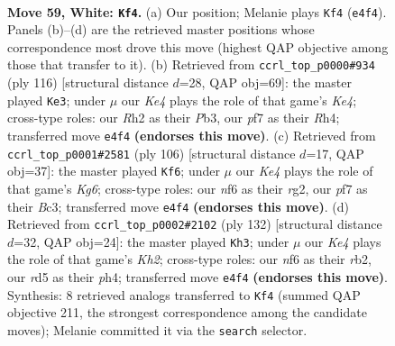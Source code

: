\documentclass[11pt]{article}
\begin{document}
\clearpage

\begin{figure}[p]\centering
\begin{subfigure}{0.46\textwidth}\centering
\resizebox{\linewidth}{!}{%
\newchessgame
\chessboard[
  setfen={7k/5p2/5n2/3r4/pB2K2p/P6P/5P1R/8 w - - 1 59},
  showmover=false,
  pgfstyle=straightmove, color=movearrow, markmove={e4-f4}
]}
\caption{}
\end{subfigure}\hfill
\begin{subfigure}{0.46\textwidth}\centering
\resizebox{\linewidth}{!}{%
\newchessgame
\chessboard[
  setfen={5r2/8/1p2k3/p5P1/P3KB1R/1P6/5n2/8 w - - 3 59},
  showmover=false,
  pgfstyle=straightmove, color=movearrow, markmove={e4-e3}
]}
\caption{}
\end{subfigure}
\\[4pt]
\begin{subfigure}{0.46\textwidth}\centering
\resizebox{\linewidth}{!}{%
\newchessgame
\chessboard[
  setfen={4k3/2p5/2n1p1K1/2P1P3/4P2P/2B4R/6r1/8 w - - 13 54},
  showmover=false,
  pgfstyle=straightmove, color=movearrow, markmove={g6-f6}
]}
\caption{}
\end{subfigure}\hfill
\begin{subfigure}{0.46\textwidth}\centering
\resizebox{\linewidth}{!}{%
\newchessgame
\chessboard[
  setfen={5k2/7p/5P2/R5P1/p1p4p/P7/1r5K/8 w - - 0 67},
  showmover=false,
  pgfstyle=straightmove, color=movearrow, markmove={h2-h3}
]}
\caption{}
\end{subfigure}
\caption{\textbf{Move 59, White: \texttt{Kf4}.} (a) Our position; Melanie plays \texttt{Kf4} (\texttt{e4f4}). Panels (b)--(d) are the retrieved master positions whose correspondence most drove this move (highest QAP objective among those that transfer to it). (b) Retrieved from \texttt{ccrl\_top\_p0000\#934} (ply 116) [structural distance $d$=28, QAP obj=69]: the master played \texttt{Ke3}; under $\mu$ our \emph{Ke4} plays the role of that game's \emph{Ke4}; cross-type roles: our \emph{R}h2 as their \emph{P}b3, our \emph{p}f7 as their \emph{R}h4; transferred move \texttt{e4f4} \textbf{(endorses this move)}. (c) Retrieved from \texttt{ccrl\_top\_p0001\#2581} (ply 106) [structural distance $d$=17, QAP obj=37]: the master played \texttt{Kf6}; under $\mu$ our \emph{Ke4} plays the role of that game's \emph{Kg6}; cross-type roles: our \emph{n}f6 as their \emph{r}g2, our \emph{p}f7 as their \emph{B}c3; transferred move \texttt{e4f4} \textbf{(endorses this move)}. (d) Retrieved from \texttt{ccrl\_top\_p0002\#2102} (ply 132) [structural distance $d$=32, QAP obj=24]: the master played \texttt{Kh3}; under $\mu$ our \emph{Ke4} plays the role of that game's \emph{Kh2}; cross-type roles: our \emph{n}f6 as their \emph{r}b2, our \emph{r}d5 as their \emph{p}h4; transferred move \texttt{e4f4} \textbf{(endorses this move)}. Synthesis: 8 retrieved analogs transferred to \texttt{Kf4} (summed QAP objective 211, the strongest correspondence among the candidate moves); Melanie committed it via the \texttt{search} selector.}
\label{fig:thought-m116}
\end{figure}
\end{document}
